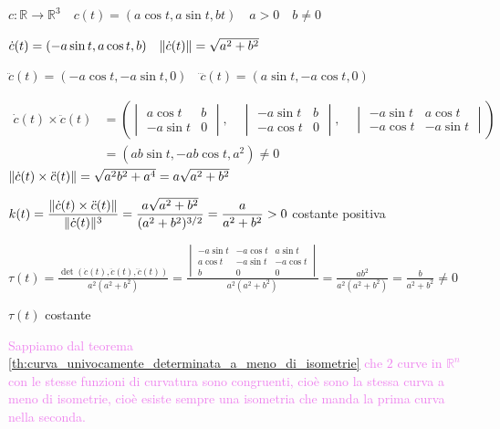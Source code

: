        \begin{esempio}
        \label{es:curvatura_e_torsione_elica_cilindrica}
        \mbox{}

        $c \colon \mathbb{R} \to \mathbb{R}^3 \quad c(t) = (a \cos t, a \sin t, bt) \quad a>0 \quad b \neq 0$

        $\dot{c}(t)=(-a \sin t, a \cos t, b) \quad \lVert\dot{c}(t)\rVert = \sqrt{a^2 + b^2}$

        $\ddot{c}(t)=(-a \cos t, -a \sin t, 0) \quad \dddot{c}(t)=(a \sin t, -a \cos t, 0)$

        \begin{align*} 
        \dot{c}(t) \times \ddot{c}(t) &= \left( \begin{vmatrix}   a \cos t &  b \\   -a \sin t & 0 \end{vmatrix}, \quad  \begin{vmatrix}-a \sin t & b \\ -a \cos t & 0 \end{vmatrix}, \quad \begin{vmatrix} -a \sin t & a \cos t \\  -a \cos t & -a \sin t  \end{vmatrix} \right) \\
        &= (a b \sin t, -a b \cos t, a^2) \neq 0
        \end{align*}
        $\lVert\dot{c}(t) \times \ddot{c}(t)\rVert = \sqrt{a^2 b^2 + a^4}= a \sqrt{a^2 +b^2} $

        $\displaystyle k(t)=\frac{\lVert\dot{c}(t) \times \ddot{c}(t)\rVert}{\lVert\dot{c}(t)\rVert^3} = \frac{a \sqrt{a^2 +b^2}}{(a^2 + b^2)^{3/2}} = \frac{a}{a^2 + b^2}>0$ costante positiva

        $\displaystyle \tau(t) = \frac{\det(\dot{c}(t), \ddot{c}(t), \dddot{c}(t)) }{a^2\left(a^2+b^2\right)}=\frac{\begin{vmatrix} -a \sin t & -a \cos t & a \sin t \\ a \cos t & -a \sin t & -a \cos t \\ b & 0 & 0 \end{vmatrix}}{a^2\left(a^2+b^2\right)} = \frac{ab^2}{a^2(a^2+b^2)} = \frac{b}{a^2+b^2} \neq 0 $

        $\tau(t)$ costante
        \end{esempio}
        \newpage 
        \textcolor{violet}{Sappiamo dal teorema \ref{th:curva_univocamente_determinata_a_meno_di_isometrie} che $2$ curve in $\mathbb{R}^n$
        con le stesse funzioni di curvatura sono congruenti, cioè sono la stessa curva a meno di isometrie, cioè esiste sempre una isometria 
        che manda la prima curva nella seconda.}
